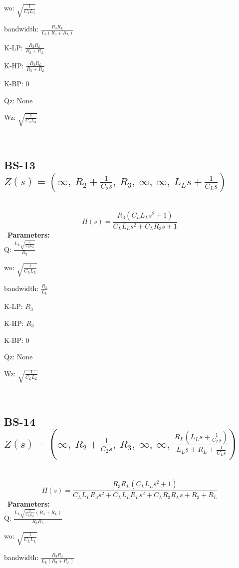 \documentclass{article}
\begin{document}
wo: $\sqrt{\frac{1}{C_{3} L_{3}}}$\ 

bandwidth: $\frac{R_{3} R_{L}}{L_{3} \left(R_{3} + R_{L}\right)}$\ 

K-LP: $\frac{R_{3} R_{L}}{R_{3} + R_{L}}$\ 

K-HP: $\frac{R_{3} R_{L}}{R_{3} + R_{L}}$\ 

K-BP: $0$\ 

Qz: $\text{None}$\ 

Wz: $\sqrt{\frac{1}{C_{3} L_{3}}}$\ 

\ 

\subsection{BS-13 $Z(s) = \left( \infty, \  R_{2} + \frac{1}{C_{2} s}, \  R_{3}, \  \infty, \  \infty, \  L_{L} s + \frac{1}{C_{L} s}\right)$ } \ 
\textbf{\[H(s) = \frac{R_{3} \left(C_{L} L_{L} s^{2} + 1\right)}{C_{L} L_{L} s^{2} + C_{L} R_{3} s + 1}\] } \ 
\textbf{Parameters:}\\ 

Q: $\frac{L_{L} \sqrt{\frac{1}{C_{L} L_{L}}}}{R_{3}}$\ 

wo: $\sqrt{\frac{1}{C_{L} L_{L}}}$\ 

bandwidth: $\frac{R_{3}}{L_{L}}$\ 

K-LP: $R_{3}$\ 

K-HP: $R_{3}$\ 

K-BP: $0$\ 

Qz: $\text{None}$\ 

Wz: $\sqrt{\frac{1}{C_{L} L_{L}}}$\ 

\ 

\subsection{BS-14 $Z(s) = \left( \infty, \  R_{2} + \frac{1}{C_{2} s}, \  R_{3}, \  \infty, \  \infty, \  \frac{R_{L} \left(L_{L} s + \frac{1}{C_{L} s}\right)}{L_{L} s + R_{L} + \frac{1}{C_{L} s}}\right)$ } \ 
\textbf{\[H(s) = \frac{R_{3} R_{L} \left(C_{L} L_{L} s^{2} + 1\right)}{C_{L} L_{L} R_{3} s^{2} + C_{L} L_{L} R_{L} s^{2} + C_{L} R_{3} R_{L} s + R_{3} + R_{L}}\] } \ 
\textbf{Parameters:}\\ 

Q: $\frac{L_{L} \sqrt{\frac{1}{C_{L} L_{L}}} \left(R_{3} + R_{L}\right)}{R_{3} R_{L}}$\ 

wo: $\sqrt{\frac{1}{C_{L} L_{L}}}$\ 

bandwidth: $\frac{R_{3} R_{L}}{L_{L} \left(R_{3} + R_{L}\right)}$\ 
\end{document}
